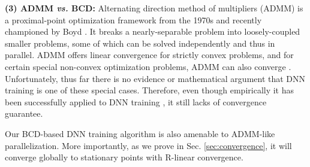 \documentclass{article}
\def\vs{\emph{vs. }}
\def\etal{\emph{et al. }}
\begin{document}
	{\bf (3) ADMM \vs BCD:}
	Alternating direction method of multipliers (ADMM) is a proximal-point optimization framework from the 1970s and recently championed by Boyd \cite{boyd2011distributed}. It breaks a nearly-separable problem into loosely-coupled smaller problems, some of which can be solved independently and thus in parallel. ADMM offers linear convergence for strictly convex problems, and for certain special non-convex optimization problems, ADMM can also converge \cite{nishihara2015general,wang2015global}. %
Unfortunately, thus far there is no evidence or mathematical argument that DNN training is one of these special cases. Therefore, even though empirically it has been successfully applied to DNN training \cite{taylor2016training,Zhang_2016_CVPR}, it still lacks of convergence guarantee. %

	Our BCD-based DNN training algorithm is also amenable to ADMM-like parallelization.  More importantly, as we prove in Sec. \ref{sec:convergence}, it will converge globally to stationary points with R-linear convergence.
    
\end{document}
